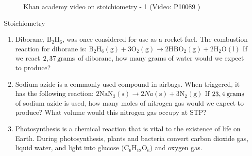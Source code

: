     \noindent
    \vspace{-1cm}
\label{m38712*eip-546}
    \setcounter{subfigure}{0}
	\begin{figure}[H] %
    \textnormal{Khan academy video on stoichiometry - 1}\vspace{.1in} \nopagebreak
  \label{m38712*yt-media4}\label{m38712*yt-video4}
             { (Video:  P10089 )}
 \end{figure}       \par \label{m38712*secfhsst!!!underscore!!!id2276}
    \noindent \vspace{-2cm}
            \begin{exercises}{  Stoichiometry
      }
            \nopagebreak
      \label{m38712*id285393}\begin{enumerate}[noitemsep, label=\textbf{\arabic*}. ] 
            \label{m38712*uid101}\item Diborane, $\text{B}{}_{2}\text{H}{}_{6}$, was once considered for use as a rocket fuel. The combustion reaction for diborane is:
${\text{B}}_{2}{\text{H}}_{6}\left(\text{g}\right)+3{\text{O}}_{2}\left(\text{g}\right)\to 2\text{H}\text{B}{\text{O}}_{2}\left(\text{g}\right)+2{\text{H}}_{2}\text{O}\left(\text{l}\right)$
If we react $2,37\phantom{\rule{2pt}{0ex}}\text{grams}$ of diborane, how many grams of water would we expect to produce?\newline
\label{m38712*uid102}\item Sodium azide is a commonly used compound in airbags. When triggered, it has the following reaction:
$2{\text{NaN}}_{3}\left(\text{s}\right)\to 2Na\left(\text{s}\right)+3{\text{N}}_{2}\left(\text{g}\right)$
If $23,4\phantom{\rule{2pt}{0ex}}\text{grams}$ of sodium azide is used, how many moles of nitrogen gas would we expect to produce? What volume would this nitrogen gas occupy at STP?\newline
\label{m38712*uid103}\item Photosynthesis is a chemical reaction that is vital to the existence of life on Earth. During photosynthesis, plants and bacteria convert carbon dioxide gas, liquid water, and light into glucose ($\text{C}{}_{6}\text{H}{}_{12}\text{O}{}_{6}$) and oxygen gas.
\label{m38712*id285674}\begin{enumerate}[noitemsep, label=\textbf{\alph*}. ] 

\end{enumerate}
\end{enumerate}
\end{exercises}
